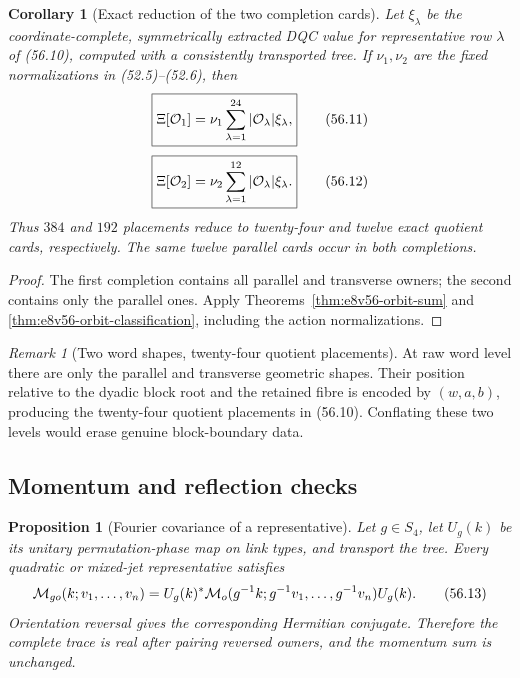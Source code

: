 \documentclass[11pt,oneside]{book}
\newtheorem{proposition}[theorem]{Proposition}
\newtheorem{corollary}[theorem]{Corollary}
\theoremstyle{definition}
\theoremstyle{remark}
\newtheorem{remark}[theorem]{Remark}
\begin{document}
\begin{corollary}[Exact reduction of the two completion cards]
\label{cor:e8v56-completion-reduction}
Let \(\xi_\lambda\) be the coordinate-complete, symmetrically
extracted DQC value for representative row \(\lambda\) of
(56.10), computed with a consistently transported tree.  If
\(\nu_1,\nu_2\) are the fixed normalizations in
(52.5)--(52.6), then
\[
 \boxed{
 \Xi[{\cal O}_1]
 =\nu_1\sum_{\lambda=1}^{24}
 |{\cal O}_\lambda|\xi_\lambda,}                              \tag{56.11}
\]
\[
 \boxed{
 \Xi[{\cal O}_2]
 =\nu_2\sum_{\lambda=1}^{12}
 |{\cal O}_\lambda|\xi_\lambda.}                              \tag{56.12}
\]
Thus \(384\) and \(192\) placements reduce to twenty-four and
twelve exact quotient cards, respectively.  The same twelve
parallel cards occur in both completions.
\end{corollary}

\begin{proof}
The first completion contains all parallel and transverse owners;
the second contains only the parallel ones.  Apply
Theorems~\ref{thm:e8v56-orbit-sum} and
\ref{thm:e8v56-orbit-classification}, including the action
normalizations.
\end{proof}

\begin{remark}[Two word shapes, twenty-four quotient placements]
\label{rem:e8v56-shapes-vs-cards}
At raw word level there are only the parallel and transverse
geometric shapes.  Their position relative to the dyadic block
root and the retained fibre is encoded by \((w,a,b)\), producing
the twenty-four quotient placements in (56.10).  Conflating these
two levels would erase genuine block-boundary data.
\end{remark}

\subsection{Momentum and reflection checks}

\begin{proposition}[Fourier covariance of a representative]
\label{prop:e8v56-Fourier-covariance}
Let \(g\in S_4\), let \(U_g(k)\) be its unitary permutation-phase
map on link types, and transport the tree.  Every quadratic or
mixed-jet representative satisfies
\[
 {\cal M}_{go}(k;v_1,\ldots,v_n)
 =U_g(k)^*
 {\cal M}_o(g^{-1}k;g^{-1}v_1,\ldots,g^{-1}v_n)
 U_g(k).                                                     \tag{56.13}
\]
Orientation reversal gives the corresponding Hermitian conjugate.
Therefore the complete trace is real after pairing reversed
owners, and the momentum sum is unchanged.
\end{proposition}
\end{document}
